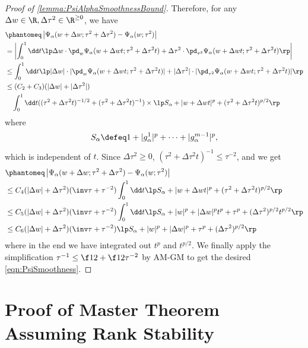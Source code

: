 \documentclass[main.tex]{subfiles}
\begin{document}
\begin{proof}[Proof of \cref{lemma:PsiAlphaSmoothnessBound}]
Therefore, for any $\Delta w \in \R, \Delta \tau^2 \in \R^{\ge 0}$, we have
\begin{align*}
&\phantomeq
    \left| \Psi_\alpha(w+\Delta w; \tau^2 + \Delta \tau^2) - \Psi_\alpha(w; \tau^2)\right|
    \\
&=
    \left|
    \int_0^1 \dd t \lp 
        \Delta w \cdot \pd_w \Psi_\alpha(w + \Delta w t; \tau^2 + \Delta \tau^2 t) +
        \Delta \tau^2 \cdot \pd_{\tau^2} \Psi_\alpha(w + \Delta w t; \tau^2 + \Delta \tau^2 t)
        \rp
    \right|
    \\
&\le
    \int_0^1 \dd t \lp 
        |\Delta w| \cdot |\pd_w \Psi_\alpha(w + \Delta w t; \tau^2 + \Delta \tau^2 t)| +
        |\Delta \tau^2| \cdot |\pd_{\tau^2} \Psi_\alpha(w + \Delta w t; \tau^2 + \Delta \tau^2 t)|
        \rp
    \\
&\le
    (C_2 + C_3)
    (|\Delta w| + |\Delta \tau^2|)
    \\
&\quad
    \int_0^1 \dd t
        ((\tau^2 + \Delta \tau^2 t)^{-1/2} + (\tau^2 + \Delta \tau^2 t)^{-1})
        \times
        \lp S_\alpha + |w+\Delta w t|^p + (\tau^2 + \Delta\tau^2 t)^{p/2} \rp
\end{align*}
where
\[S_\alpha \defeq 1 + |g^1_\alpha|^{p} + \cdots + |g^{\MM-1}_\alpha|^p,\]
which is independent of $t$.
Since $\Delta \tau^2 \ge 0$, $(\tau^2 + \Delta \tau^2 t)^{-1} \le \tau^{-2}$, and we get
\begin{align*}
&\phantomeq
    \left| \Psi_\alpha(w+\Delta w; \tau^2 + \Delta \tau^2) - \Psi_\alpha(w; \tau^2)\right|
    \\
&\le
    C_4
    (|\Delta w| + \Delta \tau^2)
    (\inv \tau + \tau^{-2})
    \int_0^1 \dd t
        \lp S_\alpha + |w+\Delta w t|^p + (\tau^2 + \Delta\tau^2 t)^{p/2} \rp
    \\
&\le
    C_5
    (|\Delta w| + \Delta \tau^2)
    (\inv \tau + \tau^{-2})
    \int_0^1 \dd t
        \lp S_\alpha + |w|^p + |\Delta w|^p t^p + \tau^p + (\Delta\tau^2)^{p/2} t^{p/2} \rp
    \\
&\le
    C_6
    (|\Delta w| + \Delta \tau^2)
    (\inv \tau + \tau^{-2})
        \lp S_\alpha + |w|^p + |\Delta w|^p + \tau^p + (\Delta\tau^2)^{p/2} \rp
\end{align*}
where in the end we have integrated out $t^p$ and $t^{p/2}$.
We finally apply the simplification $\tau^{-1} \le \f 1 2 + \f 1 2 \tau^{-2}$ by AM-GM to get the desired \cref{eqn:PsiSmoothness}.
\end{proof}

\section{Proof of \texorpdfstring{\netsortplus{}}{NetsorT+} Master Theorem Assuming Rank Stability}
\end{document}
